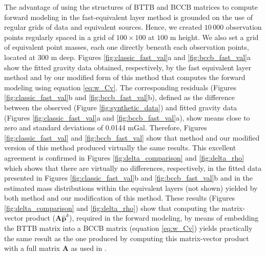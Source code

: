\documentclass[manuscript,revised]{geophysics}
\begin{document}
The advantage of using the structures of BTTB and BCCB matrices to compute forward modeling in  the fast-equivalent layer method \cite[]{siqueira-etal2017} is grounded on the use of regular grids of data and equivalent sources. Hence, we created $10\,000$ observation points regularly spaced in a grid of $100 \times 100$ at $100$ m height. We also set a grid of equivalent point masses, each one directly beneath each observation points, located at $300$ m deep.  Figures \ref{fig:classic_fast_val}a and \ref{fig:bccb_fast_val}a  show the fitted gravity data obtained, respectively, by the fast equivalent layer method and by our modified form of this method that computes the forward modeling using equation \ref{eq:w_Cv}. The corresponding residuals (Figures \ref{fig:classic_fast_val}b and \ref{fig:bccb_fast_val}b), defined as the difference between the observed (Figure  \ref{fig:synthetic_data}) and fitted gravity data (Figures \ref{fig:classic_fast_val}a and \ref{fig:bccb_fast_val}a), show means close to zero  and standard deviations of 0.0144 mGal.  Therefore, Figures \ref{fig:classic_fast_val} and \ref{fig:bccb_fast_val} show that \citet{siqueira-etal2017} method and our modified version of this method produced virtually the same results. This excellent agreement is confirmed in Figures \ref{fig:delta_comparison} and \ref{fig:delta_rho} which shows that there are virtually no differences, respectively,  in the fitted data presented in Figures \ref{fig:classic_fast_val}b and \ref{fig:bccb_fast_val}b and in the estimated mass distributions within the equivalent layers (not shown) yielded by both \citet{siqueira-etal2017} method and our modification of this method.  These results (Figures \ref{fig:delta_comparison} and \ref{fig:delta_rho})  show that computing the matrix-vector product ($\mathbf{A} \hat{\mathbf{p}}^k$), required in the forward modeling, by means of embedding the BTTB matrix into a BCCB matrix (equation \ref{eq:w_Cv}) yields practically the same result as the one produced by computing this matrix-vector product  with a full matrix $\mathbf{A}$ as used in \citet{siqueira-etal2017}.
\end{document}

